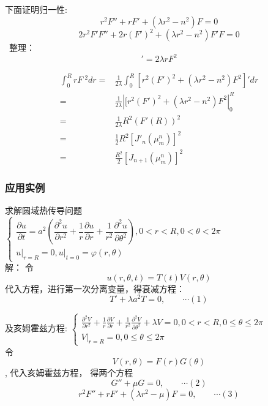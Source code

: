 \begin{frame}
	下面证明归一性:
	\begin{equation*}
		r^2 F''+r F' +(\lambda r^2 -n^2)F=0 
	\end{equation*}	
	\begin{equation*}
		2r^2 F'F''+2r (F')^2 +(\lambda r^2 -n^2)F'F=0 
	\end{equation*}	
	 整理：
	\begin{equation*}
		[r^2 (F')^2 + (\lambda r^2 -n^2)F^2]'=2 \lambda rF^2
	\end{equation*}	
\end{frame}	

\begin{frame}
	\begin{equation*}
		\begin{split}
			\int_0 ^R r F~^2 dr =& \frac{1}{2\lambda} \int_0 ^R [r^2 (F')^2 + (\lambda r^2 -n^2)F^2]' dr  \\
			=& \frac{1}{2\lambda} |[r^2 (F')^2 + (\lambda r^2 -n^2)F^2 |_0 ^R \\
			=& \frac{1}{2\lambda} R^2 (F'(R))^2 \\
			=& \frac{1}{2} R^2 [J'_n(\mu_m ^n)]^2 \\
			=& \frac{R^2}{2} [J_{n+1}(\mu_m ^n)]^2
		\end{split}
	\end{equation*}	
\end{frame}	

\begin{frame}
	\frametitle{应用实例}
	求解圆域热传导问题 \\
	$\left\{
		\begin{array}{l}
		\dfrac{\partial u}{\partial t}=a^{2}\left(\dfrac{\partial^{2} u}{\partial r^{2}}+\dfrac{1}{r} 
		\dfrac{\partial u}{\partial r}+\dfrac{1}{r^{2}} \dfrac{\partial^{2} u}{\partial \theta^{2}}\right), 0<r<R, 0<\theta<2 \pi \\
		\left. u\right|_{r=R}=0,\left.u\right|_{t=0}=\varphi(r, \theta)
	\end{array}
	\right. $\\
	\alert{解：} 令 
	\begin{equation*}
		u(r,\theta,t)= T(t) V(r, \theta) 
	\end{equation*}	
	代入方程，进行第一次分离变量，得衰减方程：\[T'+\lambda a^2 T=0, \qquad \cdots (1) \]	
\end{frame}

\begin{frame}
	及亥姆霍兹方程:
	$\left\{
	\begin{array}{l}
		\frac{\partial^{2} V}{\partial r^{2}}+\frac{1}{r} \frac{\partial V}{\partial r}+\frac{1}{r^{2}} 
		\frac{\partial^{2} V}{\partial \theta^{2}}+\lambda V=0, 0<r<R, 
		0 \leq \theta \leq 2 \pi \\
		\left.V\right|_{r=R}=0, 0 \leq \theta \leq 2 \pi
		\end{array}
	\right.$\\
	令\[V(r, \theta) =F(r)G(\theta)\], 代入亥姆霍兹方程， 得两个方程\\
	\[G''+\mu G=0, \qquad \cdots (2) \]
	\[r^2 F''+r F' +(\lambda r^2 -\mu )F=0, \qquad \cdots (3) \]
\end{frame}	

